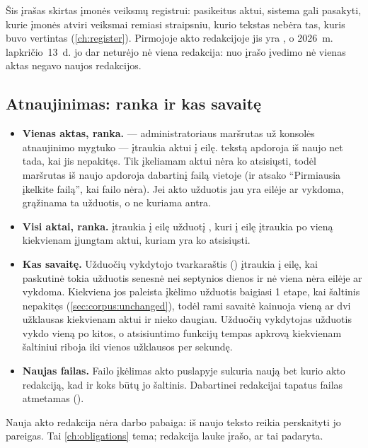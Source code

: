 Šis įrašas skirtas įmonės veiksmų registrui: pasikeitus aktui, sistema gali pasakyti, kurie
įmonės atviri veiksmai remiasi straipsniu, kurio tekstas nebėra tas, kuris buvo vertintas
(\cref{ch:register}). Pirmojoje akto redakcijoje jis yra , o 2026~m. lapkričio~13~d.
jo dar neturėjo nė viena redakcija: nuo įrašo įvedimo nė vienas aktas negavo naujos redakcijos.

\subsection{Atnaujinimas: ranka ir kas savaitę}\label{sec:corpus:refresh}

\begin{itemize}
  \item \textbf{Vienas aktas, ranka.}  ---
    administratoriaus maršrutas už konsolės atnaujinimo mygtuko --- įtraukia aktui
     į eilę.  tekstą apdoroja iš naujo net tada, kai jis
    nepakitęs. Tik įkeliamam aktui nėra ko atsisiųsti, todėl maršrutas iš naujo apdoroja
    dabartinį failą vietoje (ir atsako \enquote{Pirmiausia įkelkite failą}, kai failo nėra). Jei
    akto užduotis jau yra eilėje ar vykdoma, grąžinama ta užduotis, o ne kuriama antra.
  \item \textbf{Visi aktai, ranka.}  įtraukia į eilę
    užduotį , kuri į eilę įtraukia po vieną 
    kiekvienam įjungtam aktui, kuriam yra ko atsisiųsti.
  \item \textbf{Kas savaitę.} Užduočių vykdytojo tvarkaraštis ()
    įtraukia  į eilę, kai paskutinė tokia užduotis senesnė nei
    septynios dienos ir nė viena nėra eilėje ar vykdoma. Kiekviena jos paleista įkėlimo
    užduotis baigiasi 1 etape, kai šaltinis nepakitęs (\cref{sec:corpus:unchanged}), todėl
    rami savaitė kainuoja vieną ar dvi užklausas kiekvienam aktui ir nieko daugiau. Užduočių
    vykdytojas užduotis vykdo vieną po kitos, o atsisiuntimo funkcijų tempas apkrovą
    kiekvienam šaltiniui riboja iki vienos užklausos per sekundę.
  \item \textbf{Naujas failas.} Failo įkėlimas akto puslapyje sukuria naują bet kurio akto
    redakciją, kad ir koks būtų jo šaltinis. Dabartinei redakcijai tapatus failas atmetamas
    ().
\end{itemize}

Nauja akto redakcija nėra darbo pabaiga: iš naujo teksto reikia perskaityti jo pareigas. Tai
\cref{ch:obligations} tema; redakcija lauke  įrašo, ar tai
padaryta.


